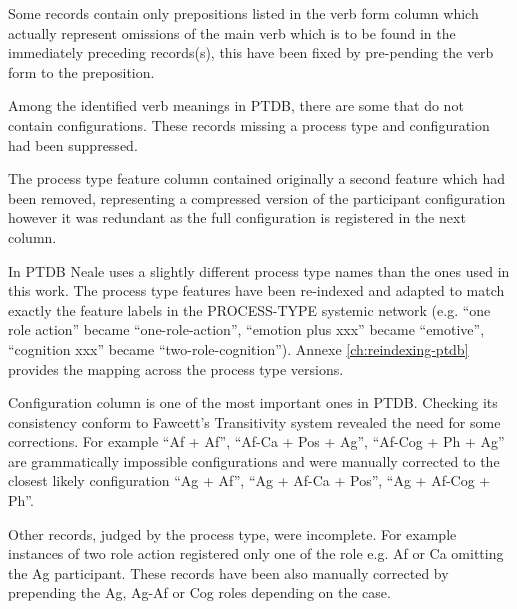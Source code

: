 Some records contain only prepositions listed in the verb form column which actually represent omissions of the main verb which is to be found in the immediately preceding records(s), this have been fixed by pre-pending the verb form to the preposition. 


Among the identified verb meanings in PTDB, there are some that do not contain configurations. These records missing a process type and configuration had been suppressed. 

The process type feature column contained originally a second feature which had been removed, representing a compressed version of the participant configuration however it was redundant as the full configuration is registered in the next column. 

In PTDB Neale uses a slightly different process type names than the ones used in this work. The process type features have been re-indexed and adapted to match exactly the feature labels in the PROCESS-TYPE systemic network (e.g. ``one role action'' became ``one-role-action'', ``emotion plus xxx'' became ``emotive'', ``cognition xxx'' became ``two-role-cognition''). Annexe \ref{ch:reindexing-ptdb} provides the mapping across the process type versions. 

Configuration column is one of the most important ones in PTDB. Checking its consistency conform to Fawcett's Transitivity system revealed the need for some corrections. For example ``Af + Af'', ``Af-Ca + Pos + Ag'', ``Af-Cog + Ph + Ag'' are grammatically impossible configurations and were manually corrected to the closest likely configuration ``Ag + Af'', ``Ag + Af-Ca + Pos'', ``Ag + Af-Cog + Ph''.

Other records, judged by the process type, were incomplete. For example instances of two role action registered only one of the role e.g. Af or Ca omitting the Ag participant. These records have been also manually corrected by prepending the Ag, Ag-Af or Cog roles depending on the case. 


